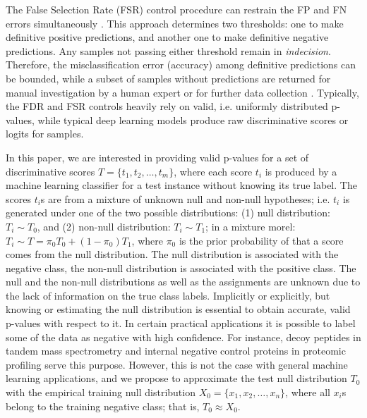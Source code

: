 \documentclass{article}
\newcommand{\edit}[1]{{\color{red}#1}}
\begin{document}
The False Selection Rate (FSR) control procedure can restrain the FP and FN errors simultaneously \cite{zhao2023controlling}. This approach determines two thresholds: one to make definitive positive predictions, and another one to make definitive negative predictions. Any samples not passing either threshold remain in {\em indecision}. Therefore, the misclassification error (accuracy) among definitive predictions can be bounded, while a subset of samples without predictions are returned for manual investigation by a human expert or for further data collection \cite{rava2021burden}. Typically, the FDR and FSR controls heavily rely on valid, i.e. uniformly distributed p-values, while typical deep learning models produce raw discriminative scores or logits for samples. 

\edit{In this paper, we are interested in providing valid p-values for a set of discriminative scores $T=\{t_1, t_2, \dots, t_m\}$, where each score $t_i$ is produced by a machine learning classifier for a test instance without knowing its true label. The scores $t_i$s are from a mixture of unknown null and non-null hypotheses; i.e. $t_i$ is generated under one of the two possible distributions: (1) null distribution: $T_i\sim T_0$, and (2) non-null distribution: $T_i\sim T_1$; in a mixture morel: $T_i\sim T=\pi_0 T_0 + (1-\pi_0)T_1$, where $\pi_0$ is the prior probability of that a score comes from the null distribution. The null distribution is associated with the negative class, the non-null distribution is associated with the positive class. The null and the non-null distributions as well as the assignments are unknown due to the lack of information on the true class labels. Implicitly or explicitly, but knowing or estimating the null distribution is essential to obtain accurate, valid p-values with respect to it. In certain practical applications it is possible to label some of the data as negative with high confidence. For instance, decoy peptides\cite{elias2007target} in tandem mass spectrometry and internal negative control proteins \cite{gao2023simultaneous} in proteomic profiling serve this purpose. However, this is not the case with general machine learning applications, and we propose to approximate the test null distribution $T_0$ with the empirical training null distribution $X_0 = \{x_1, x_2, \dots, x_n\}$, where all $x_i$s belong to the training negative class; that is, $T_0 \approx X_0 $.}
  
\end{document}

